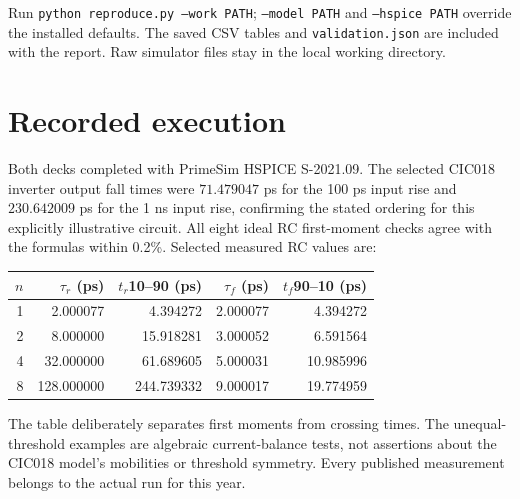 \documentclass[11pt,a4paper]{article}
\begin{document}
Run \texttt{python reproduce.py --work PATH}; \texttt{--model PATH} and
\texttt{--hspice PATH} override the installed defaults.
The saved CSV tables and \texttt{validation.json} are included with the
report. Raw simulator files stay in the local working directory.
\section*{Recorded execution}
Both decks completed with PrimeSim HSPICE S-2021.09. The selected CIC018
inverter output fall times were $71.479047$ ps for the 100 ps input rise and
$230.642009$ ps for the 1 ns input rise, confirming the stated ordering for this
explicitly illustrative circuit. All eight ideal RC first-moment checks
agree with the formulas within 0.2\%. Selected measured RC values are:
\begin{center}\begin{tabular}{rrrrr}
\toprule $n$&$\tau_r$ (ps)&$t_r$10--90 (ps)&$\tau_f$ (ps)&$t_f$90--10 (ps)\\\midrule
1&2.000077&4.394272&2.000077&4.394272\\
2&8.000000&15.918281&3.000052&6.591564\\
4&32.000000&61.689605&5.000031&10.985996\\
8&128.000000&244.739332&9.000017&19.774959\\
\bottomrule\end{tabular}\end{center}
The table deliberately separates first moments from crossing times.
The unequal-threshold examples are algebraic current-balance tests,
not assertions about the CIC018 model's mobilities or threshold symmetry.
Every published measurement belongs to the actual run for this year.
\end{document}
